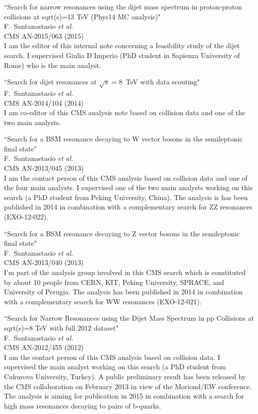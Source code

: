 \documentclass[10pt, a4paper]{article}
\begin{document}
\begin{thebibliography}{599}
``Search for narrow resonances using the dijet mass spectrum in proton-proton collisions at sqrt(s)=13 TeV (Phys14 MC analysis)"
  \\{}F.~Santanastasio {\it et al.}
  \\{}CMS AN-2015/063 (2015)
  \\ I am the editor of this internal note concerning a feasibility study of
  the dijet search. I supervised Giulia D'Imperio (PhD student in Sapienza University of Rome) who is
  the main analyst.

``Search for dijet resonances at $\sqrt{s}=8$~TeV with data scouting"
  \\{}F.~Santanastasio {\it et al.}
  \\{}CMS AN-2014/104 (2014)
  \\ I am co-editor of this CMS analysis note based on collision data and one of the two main analysts. 

``Search for a BSM resonance decaying to W vector bosons in the semileptonic final state"
  \\{}F.~Santanastasio {\it et al.}
  \\{}CMS AN-2013/045 (2013)
  \\ I am the contact person of this CMS analysis based on collision data and one of the four main analysts. I supervised one of the two main analysts working on this search (a PhD student from Peking University, China). The analysis is has been published in 2014 in combination with a complementary search for ZZ resonances (EXO-12-022).

``Search for a BSM resonance decaying to Z vector bosons in the semileptonic final state"
  \\{}F.~Santanastasio {\it et al.}
  \\{}CMS AN-2013/040 (2013)
  \\ I'm part of the analysis group involved in this CMS search which is constituted by about 10 people from CERN, KIT, Peking University, SPRACE, and University of Perugia. 
The analysis has been published in 2014 in combination with a complementary search for WW resonances (EXO-12-021).

``Search for Narrow Resonances using the Dijet Mass Spectrum in pp Collisions at sqrt(s)=8 TeV with full 2012 dataset"
  \\{}F.~Santanastasio {\it et al.}
  \\{}CMS AN-2012/455 (2012)
  \\ I am the contact person of this CMS analysis based on collision data. I supervised the main analyst working on this search (a PhD student from Cukurova University, Turkey). A public preliminary result has been released by the CMS collaboration on February 2013 in view of the Moriond/EW conference. The analysis is aiming for publication in 2015 in combination with a search for high mass resonances decaying to pairs of b-quarks.


\end{thebibliography}
\end{document}

